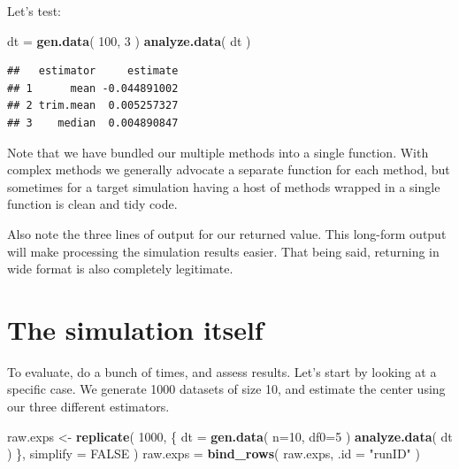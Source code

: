 \documentclass[
]{book}
\newenvironment{Shaded}{\begin{snugshade}}{\end{snugshade}}
\newcommand{\AttributeTok}[1]{\textcolor[rgb]{0.13,0.29,0.53}{#1}}
\newcommand{\ConstantTok}[1]{\textcolor[rgb]{0.56,0.35,0.01}{#1}}
\newcommand{\DecValTok}[1]{\textcolor[rgb]{0.00,0.00,0.81}{#1}}
\newcommand{\FunctionTok}[1]{\textcolor[rgb]{0.13,0.29,0.53}{\textbf{#1}}}
\newcommand{\NormalTok}[1]{#1}
\newcommand{\OtherTok}[1]{\textcolor[rgb]{0.56,0.35,0.01}{#1}}
\newcommand{\StringTok}[1]{\textcolor[rgb]{0.31,0.60,0.02}{#1}}
\begin{document}
Let's test:

\begin{Shaded}
\begin{Highlighting}[]
\NormalTok{dt }\OtherTok{=} \FunctionTok{gen.data}\NormalTok{( }\DecValTok{100}\NormalTok{, }\DecValTok{3}\NormalTok{ )}
\FunctionTok{analyze.data}\NormalTok{( dt )}
\end{Highlighting}
\end{Shaded}

\begin{verbatim}
##   estimator     estimate
## 1      mean -0.044891002
## 2 trim.mean  0.005257327
## 3    median  0.004890847
\end{verbatim}

Note that we have bundled our multiple methods into a single function.
With complex methods we generally advocate a separate function for each method, but sometimes for a target simulation having a host of methods wrapped in a single function is clean and tidy code.

Also note the three lines of output for our returned value.
This long-form output will make processing the simulation results easier.
That being said, returning in wide format is also completely legitimate.

\section{The simulation itself}\label{the-simulation-itself}

To evaluate, do a bunch of times, and assess results. Let's start by looking
at a specific case. We generate 1000 datasets of size 10, and estimate the
center using our three different estimators.

\begin{Shaded}
\begin{Highlighting}[]
\NormalTok{raw.exps }\OtherTok{\textless{}{-}} \FunctionTok{replicate}\NormalTok{( }\DecValTok{1000}\NormalTok{, \{}
\NormalTok{    dt }\OtherTok{=} \FunctionTok{gen.data}\NormalTok{( }\AttributeTok{n=}\DecValTok{10}\NormalTok{, }\AttributeTok{df0=}\DecValTok{5}\NormalTok{ )}
    \FunctionTok{analyze.data}\NormalTok{( dt )}
\NormalTok{\}, }\AttributeTok{simplify =} \ConstantTok{FALSE}\NormalTok{ )}
\NormalTok{raw.exps }\OtherTok{=} \FunctionTok{bind\_rows}\NormalTok{( raw.exps, }\AttributeTok{.id =} \StringTok{"runID"}\NormalTok{ )}
\end{Highlighting}
\end{Shaded}
\end{document}
